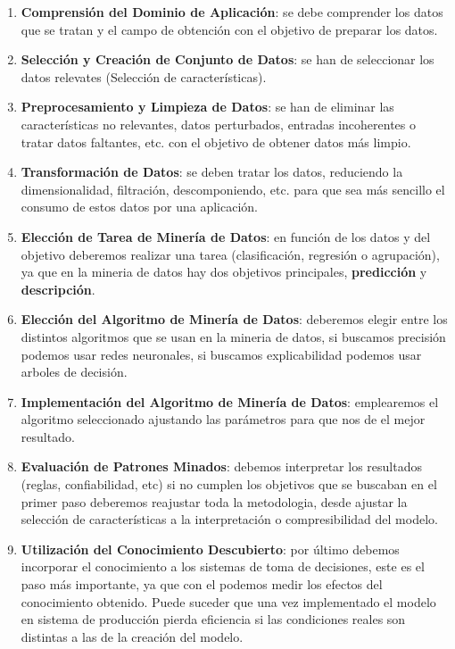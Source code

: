 \begin{enumerate}
    \item \textbf{Comprensión del Dominio de Aplicación}: se debe comprender los datos que se tratan y el campo de obtención con el objetivo de preparar los datos.
    \item \textbf{Selección y Creación de Conjunto de Datos}: se han de seleccionar los datos relevates (Selección de características).
    \item \textbf{Preprocesamiento y Limpieza de Datos}: se han de eliminar las características no relevantes, datos perturbados, entradas incoherentes o tratar datos faltantes, etc. con el objetivo de obtener datos más limpio.
    \item \textbf{Transformación de Datos}: se deben tratar los datos, reduciendo la dimensionalidad, filtración, descomponiendo, etc. para que sea más sencillo el consumo de estos datos por una aplicación.
    \item \textbf{Elección de Tarea de Minería de Datos}: en función de los datos y del objetivo deberemos realizar una tarea (clasificación, regresión o agrupación), ya que en la mineria de datos hay dos objetivos principales, \textbf{predicción} y \textbf{descripción}.
    \item \textbf{Elección del Algoritmo de Minería de Datos}: deberemos elegir entre los distintos algoritmos que se usan en la mineria de datos, si buscamos precisión podemos usar redes neuronales, si buscamos explicabilidad podemos usar arboles de decisión.
    \item \textbf{Implementación del Algoritmo de Minería de Datos}: emplearemos el algoritmo seleccionado ajustando las parámetros para que nos de el mejor resultado.
    \item \textbf{Evaluación de Patrones Minados}: debemos interpretar los resultados (reglas, confiabilidad, etc) si no cumplen los objetivos que se buscaban en el primer paso deberemos reajustar toda la metodologia, desde ajustar la selección de características a la interpretación o compresibilidad del modelo.
    \item \textbf{Utilización del Conocimiento Descubierto}: por último debemos incorporar el conocimiento a los sistemas de toma de decisiones, este es el paso más importante, ya que con el podemos medir los efectos del conocimiento obtenido. Puede suceder que una vez implementado el modelo en sistema de producción pierda eficiencia si las condiciones reales son distintas a las de la creación del modelo.
\end{enumerate}


